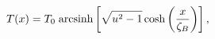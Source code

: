 \begin{equation}\label{2xe}
T(x)=T_{0}\;{\rm arcsinh}\left[\sqrt{u^{2}-1}\cosh\left(\frac{x}{\zeta_B}
\right)\right],
\end{equation}

